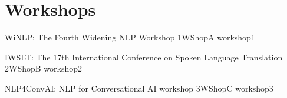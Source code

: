 \cleardoublepage
\chapter[Workshops: \daydate]{Workshops}
\thispagestyle{emptyheader}
\vfill


\afterpage{\null\newpage}
\newpage
\clearpage




\begin{wsschedule}
    {WiNLP: The Fourth Widening NLP Workshop}
    {1}{WShopA}
    {workshop1}
    {\WShopLocA}
    
\end{wsschedule}



\begin{wsschedule}
    {IWSLT: The 17th International Conference on Spoken Language Translation}
    {2}{WShopB}
    {workshop2}
    {\WShopLocB}
    
\end{wsschedule}



\begin{wsschedule}
    {NLP4ConvAI: NLP for Conversational AI workshop}
    {3}{WShopC}
    {workshop3}
    {\WShopLocC}
    
\end{wsschedule}

%     

